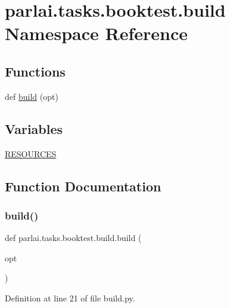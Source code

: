 \hypertarget{namespaceparlai_1_1tasks_1_1booktest_1_1build}{}\section{parlai.\+tasks.\+booktest.\+build Namespace Reference}
\label{namespaceparlai_1_1tasks_1_1booktest_1_1build}
\subsection*{Functions}
\begin{DoxyCompactItemize}
\item 
def \hyperlink{namespaceparlai_1_1tasks_1_1booktest_1_1build_acc4c0b0b235424ab52a434d122d857cc}{build} (opt)
\end{DoxyCompactItemize}
\subsection*{Variables}
\begin{DoxyCompactItemize}
\item 
\hyperlink{namespaceparlai_1_1tasks_1_1booktest_1_1build_a0168fbebb5389a8349a98a8f6e552e76}{R\+E\+S\+O\+U\+R\+C\+ES}
\end{DoxyCompactItemize}


\subsection{Function Documentation}
\mbox{\label{namespaceparlai_1_1tasks_1_1booktest_1_1build_acc4c0b0b235424ab52a434d122d857cc}} 
\subsubsection{\texorpdfstring{build()}{build()}}
{\footnotesize\ttfamily def parlai.\+tasks.\+booktest.\+build.\+build (\begin{DoxyParamCaption}\item[{}]{opt }\end{DoxyParamCaption})}



Definition at line 21 of file build.\+py.


